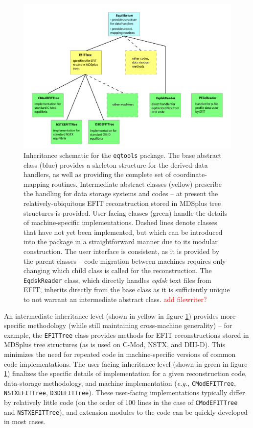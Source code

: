 \documentclass[12pt,floatfix,showpacs]{revtex4-1}
\newcommand{\eg}{\emph{e.g., }}
\newcommand{\note}[1]{\textcolor{red}{#1}}
\newcommand{\gnote}[1]{\marginpar{\scriptsize\textcolor{red}{#1}}}
\newcommand{\eqtools}{\texttt{eqtools}\xspace}
\begin{document}
\begin{figure}[p]
 \includegraphics[width=\textwidth]{graphics/flowchart.pdf}
 \caption{Inheritance schematic for the \eqtools package.  The base abstract class (blue) provides a skeleton structure for the derived-data handlers, as well as providing the complete set of coordinate-mapping routines.  Intermediate abstract classes (yellow) prescribe the handling for data storage systems and codes -- at present the relatively-ubiquitous EFIT reconstruction stored in MDSplus tree structures is provided.  User-facing classes (green) handle the details of machine-specific implementations.  Dashed lines denote classes that have not yet been implemented, but which can be introduced into the package in a straightforward manner due to its modular construction.  The user interface is consistent, as it is provided by the parent classes -- code migration between machines requires only changing which child class is called for the reconstruction.  The \texttt{EqdskReader} class, which directly handles \emph{eqdsk} text files from EFIT, inherits directly from the base class as it is sufficiently unique to not warrant an intermediate abstract class.  \note{add filewriter?}}
 \label{fig:flowchart}
\end{figure}

An intermediate inheritance level (shown in yellow in figure \ref{fig:flowchart}) provides more specific methodology (while still maintaining cross-machine generality) -- for example, the \verb|EFITTree| class provides methods for EFIT reconstructions stored in MDSplus tree structures (as is used on C-Mod, NSTX, and DIII-D\gnote{cites?}).  This minimizes the need for repeated code in machine-specific versions of common code implementations.  The user-facing inheritance level (shown in green in figure \ref{fig:flowchart}) finalizes the specific details of implementation for a given reconstruction code, data-storage methodology, and machine implementation (\eg \verb|CModEFITTree|, \verb|NSTXEFITTree|, \verb|D3DEFITTree|).  These user-facing implementations typically differ by relatively little code (on the order of 100 lines in the case of \verb|CModEFITTree| and \verb|NSTXEFITTree|), and extension modules to the code can be quickly developed in most cases.\gnote{check line count}
\end{document}

